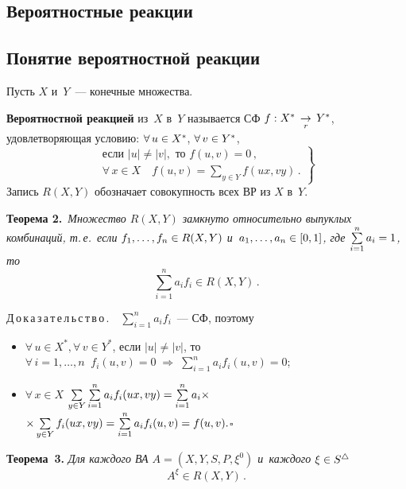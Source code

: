 \begin{multicols}{2}
\section{Вероятностные реакции}

\subsection{Понятие вероятностной реакции}

Пусть $X$ и~$Y$~--- конечные множества.

\textbf{Вероятностной реакцией} из~$X$ в~$Y$ называется СФ
$f: X^*\;\mathop{\to}\limits_{r}\; Y^*$, удовлетворяющая
условию: $\forall\,u\hm\in X^*$, $\forall\,v\hm\in Y^*$,
\begin{equation}
\left.
\begin{array}{c}
\mbox{если }|u|\neq |v|,
\mbox{ то }f(u,v)=0\,,\\[6pt]
\forall\,x\in X\quad
f(u,v)=\sum\limits_{y\in Y}f(u x,v y)\,.
\end{array}\right\}
\label{safdsdfdsafsafarrr}
\end{equation}
Запись $R(X,Y)$ обозначает совокупность всех ВР из $X$ в~$Y$.\\

\smallskip

\noindent
\textbf{Теорема 2.}\
\textit{Множество $R(X,Y)$ замкнуто относительно выпуклых комбинаций, т.\,е.\
если $f_1,\ldots, f_n\hm\in R(X,Y)$ и~$a_1,\ldots, a_n\hm\in [0,1]$, где
$\sum\limits_{i=1}^na_i\hm=1$, то}
$$
\sum\limits_{i=1}^n a_i f_i\in R(X,Y)\,.
$$

\noindent
Д\,о\,к\,а\,з\,а\,т\,е\,л\,ь\,с\,т\,в\,о\,.\ \
$\sum\limits_{i=1}^na_if_i$~--- СФ, поэтому
\begin{itemize}
\item
$\forall\,u\in X^*,\forall\,v\in Y^*$, если $|u|\neq |v|$, то\\
$\forall\,i=1,\ldots, n\;\;
f_i(u,v)=0 \;\Rightarrow\;\sum\limits_{i=1}^na_if_i(u,v)=0$;
\item $\forall\,x\in X$
$\sum\limits_{y\in Y}\sum\limits_{i=1}^na_if_i(u x,v y)\hm=
\sum\limits_{i=1}^n a_i \times$\linebreak $\times\sum\limits_{y\in Y}f_i(u x,v y)\hm=
\sum\limits_{i=1}^n a_i f_i(u,v)\hm=
f(u,v).$\hfill$\square$
\end{itemize}

\noindent
\textbf{Теорема~3.} %
\textit{Для каждого ВА
$A=(X,Y,S,P, \xi^0)$
и~каж\-до\-го} $\xi\hm\in S^\bullettri$
$$
A^{\xi} \in R(X,Y)\,.
$$


\end{multicols}
